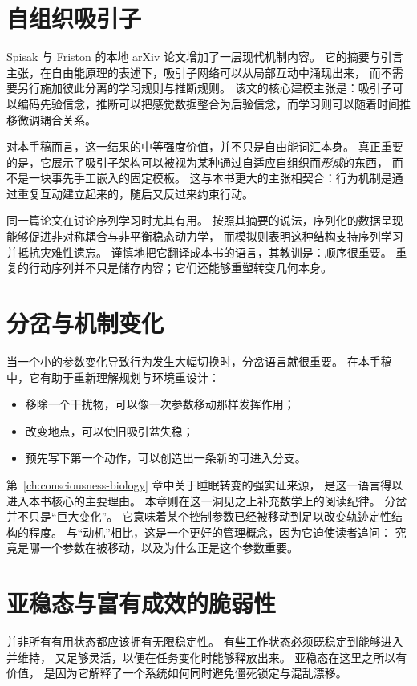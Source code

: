 \section{自组织吸引子}

Spisak 与 Friston 的本地 arXiv 论文增加了一层现代机制内容。
它的摘要与引言主张，在自由能原理的表述下，吸引子网络可以从局部互动中涌现出来，
而不需要另行施加彼此分离的学习规则与推断规则。
该文的核心建模主张是：吸引子可以编码先验信念，推断可以把感觉数据整合为后验信念，而学习则可以随着时间推移微调耦合关系。

对本手稿而言，这一结果的中等强度价值，并不只是自由能词汇本身。
真正重要的是，它展示了吸引子架构可以被视为某种通过自适应自组织而\emph{形成}的东西，
而不是一块事先手工嵌入的固定模板。
这与本书更大的主张相契合：行为机制是通过重复互动建立起来的，随后又反过来约束行动。

同一篇论文在讨论序列学习时尤其有用。
按照其摘要的说法，序列化的数据呈现能够促进非对称耦合与非平衡稳态动力学，
而模拟则表明这种结构支持序列学习并抵抗灾难性遗忘。
谨慎地把它翻译成本书的语言，其教训是：顺序很重要。
重复的行动序列并不只是储存内容；它们还能够重塑转变几何本身。

\section{分岔与机制变化}

当一个小的参数变化导致行为发生大幅切换时，分岔语言就很重要。
在本手稿中，它有助于重新理解规划与环境重设计：
\begin{itemize}[nosep]
  \item 移除一个干扰物，可以像一次参数移动那样发挥作用；
  \item 改变地点，可以使旧吸引盆失稳；
  \item 预先写下第一个动作，可以创造出一条新的可进入分支。
\end{itemize}

第~\ref{ch:consciousness-biology} 章中关于睡眠转变的强实证来源，
是这一语言得以进入本书核心的主要理由。
本章则在这一洞见之上补充数学上的阅读纪律。
分岔并不只是“巨大变化”。
它意味着某个控制参数已经被移动到足以改变轨迹定性结构的程度。
与“动机”相比，这是一个更好的管理概念，因为它迫使读者追问：
究竟是哪一个参数在被移动，以及为什么正是这个参数重要。

\section{亚稳态与富有成效的脆弱性}

并非所有有用状态都应该拥有无限稳定性。
有些工作状态必须既稳定到能够进入并维持，
又足够灵活，以便在任务变化时能够释放出来。
亚稳态在这里之所以有价值，
是因为它解释了一个系统如何同时避免僵死锁定与混乱漂移。

